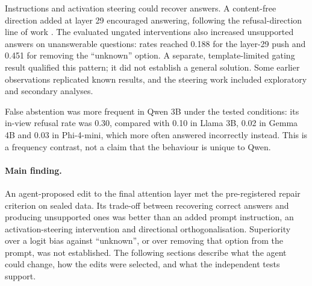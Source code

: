 Instructions and activation steering could recover answers. A content-free direction added at layer 29
encouraged answering, following the refusal-direction line of work
\citep{arditi2024refusal,lavi2025unanswerability}. The evaluated ungated interventions also increased unsupported
answers on unanswerable questions: rates reached 0.188 for the layer-29 push and 0.451 for removing the
``unknown'' option. A separate, template-limited gating result qualified this pattern; it did not establish a
general solution. Some earlier observations replicated known results, and the steering work included
exploratory and secondary analyses.

False abstention was more frequent in Qwen 3B under the tested conditions: its in-view refusal rate was 0.30,
compared with 0.10 in Llama 3B, 0.02 in Gemma 4B and 0.03 in Phi-4-mini, which more often answered incorrectly
instead. This is a frequency contrast, not a claim that the behaviour is unique to Qwen.

\paragraph{Main finding.}
An agent-proposed edit to the final attention layer met the pre-registered repair criterion on sealed data.
Its trade-off between recovering correct answers and producing unsupported ones was better than an added prompt
instruction, an activation-steering intervention and directional orthogonalisation. Superiority over a logit bias
against ``unknown'', or over removing that option from the prompt, was not established. The following sections
describe what the agent could change, how the edits were selected, and what the independent tests support.
